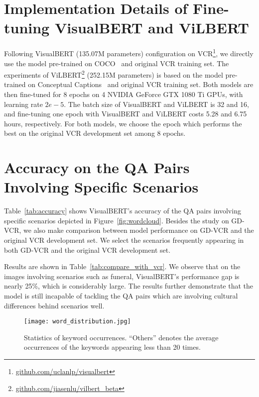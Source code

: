 \documentclass[11pt]{article}
\begin{document}
\section{Implementation Details of Fine-tuning VisualBERT and ViLBERT}
\label{appendix:implementation}
Following VisualBERT (135.07M parameters) configuration on VCR\footnote{\url{github.com/uclanlp/visualbert}}, we directly use the model pre-trained on COCO~\cite{Chen2015MicrosoftCC} and original VCR training set. The experiments of ViLBERT\footnote{\url{github.com/jiasenlu/vilbert_beta}} (252.15M parameters) is based on the model pre-trained on Conceptual Captions~\cite{sharma-etal-2018-conceptual} and original VCR training set. Both models are then fine-tuned for 8 epochs on 4 NVIDIA GeForce GTX 1080 Ti GPUs, with learning rate $2e-5$. The batch size of VisualBERT and ViLBERT is 32 and 16, and fine-tuning one epoch with VisualBERT and ViLBERT costs 5.28 and 6.75 hours, respectively. For both models, we choose the epoch which performs the best on the original VCR development set among 8 epochs.

\section{Accuracy on the QA Pairs Involving Specific Scenarios}
\label{appendix:detailed_accuracy}
Table~\ref{tab:accuracy} shows VisualBERT's accuracy of the QA pairs involving specific scenarios depicted in Figure~\ref{fig:wordcloud}. Besides the study on GD-VCR, we also make comparison between model performance on GD-VCR and the original VCR development set. We select the scenarios frequently appearing in both GD-VCR and the original VCR development set. 

Results are shown in Table~\ref{tab:compare_with_vcr}. We observe that on the images involving scenarios such as funeral, VisualBERT's performance gap is nearly 25\%, which is considerably large. The results further demonstrate that the model is still incapable of tackling the QA pairs which are involving cultural differences behind scenarios well. 

\begin{figure}[t]
    \centering
    \texttt{[image: word\_distribution.jpg]}
    \caption{Statistics of keyword occurrences. ``Others'' denotes the average occurrences of the keywords appearing less than 20 times.}
    \label{fig:keyword_occurrences}
\end{figure}
\end{document}
